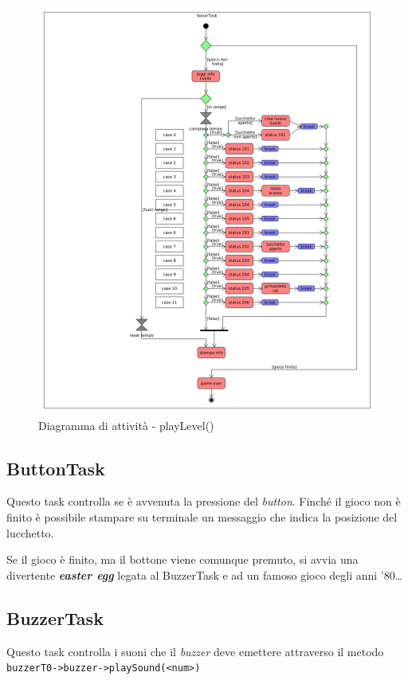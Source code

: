 \begin{figure}[!ht]
	\centering
	\includegraphics[scale=.35]{img/UML/sonartask.png}
	\caption{Diagramma di attività - playLevel()}
\end{figure}

\newpage
\subsection{ButtonTask}
Questo task controlla se è avvenuta la pressione del \textit{button}.
Finché il gioco non è finito è possibile stampare su terminale un messaggio che indica la posizione del lucchetto. 

Se il gioco è finito, ma il bottone viene comunque premuto, si avvia una divertente \textbf{\textit{easter egg}} legata al BuzzerTask e ad un famoso gioco degli anni '80\dots


\subsection{BuzzerTask}
Questo task controlla i suoni che il \textit{buzzer} deve emettere attraverso il metodo \texttt{buzzerT0->buzzer->playSound(<num>)}

